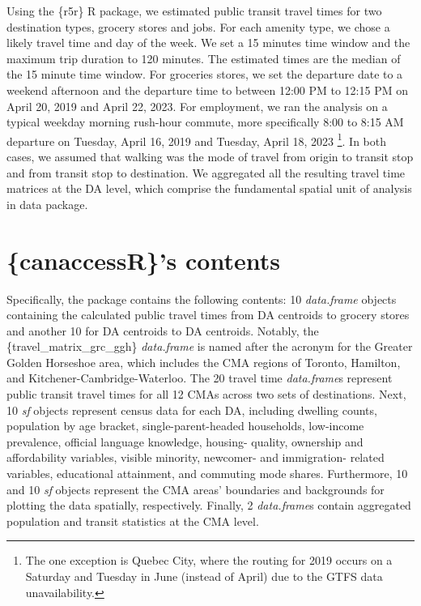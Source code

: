 \documentclass[Royal,times,sageh]{sagej}
\begin{document}
Using the \{r5r\} R package, we estimated public transit travel times
for two destination types, grocery stores and jobs. For each amenity
type, we chose a likely travel time and day of the week. We set a 15
minutes time window and the maximum trip duration to 120 minutes. The
estimated times are the median of the 15 minute time window. For
groceries stores, we set the departure date to a weekend afternoon and
the departure time to between 12:00 PM to 12:15 PM on April 20, 2019 and
April 22, 2023. For employment, we ran the analysis on a typical weekday
morning rush-hour commute, more specifically 8:00 to 8:15 AM departure
on Tuesday, April 16, 2019 and Tuesday, April 18, 2023 \footnote{The one
  exception is Quebec City, where the routing for 2019 occurs on a
  Saturday and Tuesday in June (instead of April) due to the GTFS data
  unavailability.}. In both cases, we assumed that walking was the mode
of travel from origin to transit stop and from transit stop to
destination. We aggregated all the resulting travel time matrices at the
DA level, which comprise the fundamental spatial unit of analysis in
data package.

\section{\{canaccessR\}'s contents}\label{canaccessrs-contents}

Specifically, the package contains the following contents: 10
\emph{data.frame} objects containing the calculated public travel times
from DA centroids to grocery stores and another 10 for DA centroids to
DA centroids. Notably, the \{travel\_matrix\_grc\_ggh\}
\emph{data.frame} is named after the acronym for the Greater Golden
Horseshoe area, which includes the CMA regions of Toronto, Hamilton, and
Kitchener-Cambridge-Waterloo. The 20 travel time \emph{data.frame}s
represent public transit travel times for all 12 CMAs across two sets of
destinations. Next, 10 \emph{sf} objects represent census data for each
DA, including dwelling counts, population by age bracket,
single-parent-headed households, low-income prevalence, official
language knowledge, housing- quality, ownership and affordability
variables, visible minority, newcomer- and immigration- related
variables, educational attainment, and commuting mode shares.
Furthermore, 10 and 10 \emph{sf} objects represent the CMA areas'
boundaries and backgrounds for plotting the data spatially,
respectively. Finally, 2 \emph{data.frame}s contain aggregated
population and transit statistics at the CMA level.
\end{document}
